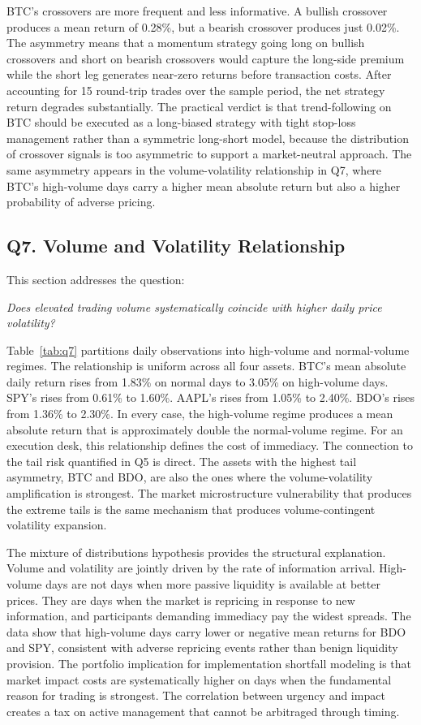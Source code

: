 BTC's crossovers are more frequent and less informative. A bullish crossover produces a mean return of 0.28\%, but a bearish crossover produces just 0.02\%. The asymmetry means that a momentum strategy going long on bullish crossovers and short on bearish crossovers would capture the long-side premium while the short leg generates near-zero returns before transaction costs. After accounting for 15 round-trip trades over the sample period, the net strategy return degrades substantially. The practical verdict is that trend-following on BTC should be executed as a long-biased strategy with tight stop-loss management rather than a symmetric long-short model, because the distribution of crossover signals is too asymmetric to support a market-neutral approach. The same asymmetry appears in the volume-volatility relationship in Q7, where BTC's high-volume days carry a higher mean absolute return but also a higher probability of adverse pricing.

\subsection{Q7. Volume and Volatility Relationship}

This section addresses the question:

\noindent\textit{Does elevated trading volume systematically coincide with higher daily price volatility?}



Table~\ref{tab:q7} partitions daily observations into high-volume and normal-volume regimes. The relationship is uniform across all four assets. BTC's mean absolute daily return rises from 1.83\% on normal days to 3.05\% on high-volume days. SPY's rises from 0.61\% to 1.60\%. AAPL's rises from 1.05\% to 2.40\%. BDO's rises from 1.36\% to 2.30\%. In every case, the high-volume regime produces a mean absolute return that is approximately double the normal-volume regime. For an execution desk, this relationship defines the cost of immediacy. The connection to the tail risk quantified in Q5 is direct. The assets with the highest tail asymmetry, BTC and BDO, are also the ones where the volume-volatility amplification is strongest. The market microstructure vulnerability that produces the extreme tails is the same mechanism that produces volume-contingent volatility expansion.

The mixture of distributions hypothesis provides the structural explanation. Volume and volatility are jointly driven by the rate of information arrival. High-volume days are not days when more passive liquidity is available at better prices. They are days when the market is repricing in response to new information, and participants demanding immediacy pay the widest spreads. The data show that high-volume days carry lower or negative mean returns for BDO and SPY, consistent with adverse repricing events rather than benign liquidity provision. The portfolio implication for implementation shortfall modeling is that market impact costs are systematically higher on days when the fundamental reason for trading is strongest. The correlation between urgency and impact creates a tax on active management that cannot be arbitraged through timing.

